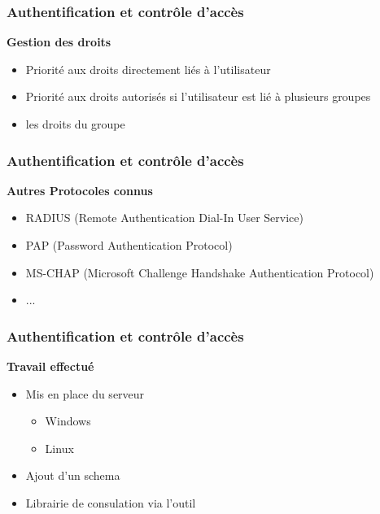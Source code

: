 \begin{frame}
  \frametitle{Authentification et contrôle d'accès}
  \begin{block}{\textbf{Gestion des droits}}
  \begin{itemize}
  \item Priorité aux droits directement liés à l'utilisateur 
  \item Priorité aux droits autorisés si l'utilisateur est lié à plusieurs groupes
  \item les droits du groupe
  \end{itemize}
  \end{block}
\end{frame}

\begin{frame}
  \frametitle{Authentification et contrôle d'accès}
  \begin{block}{\textbf{Autres Protocoles connus}}
  \begin{itemize}
  \item RADIUS (Remote Authentication Dial-In User Service)
  \item PAP (Password Authentication Protocol)
  \item MS-CHAP (Microsoft Challenge Handshake Authentication Protocol)
  \item ... 
  \end{itemize}
  \end{block}
\end{frame}

\begin{frame}
  \frametitle{Authentification et contrôle d'accès}
  \begin{block}{\textbf{Travail effectué}}
  \begin{itemize}
  \item Mis en place du serveur 
    \begin{itemize}
    \item Windows
    \item Linux
    \end{itemize}
  \item Ajout d'un schema 
  \item Librairie de consulation via l'outil %
  \end{itemize}
  \end{block}
\end{frame}


